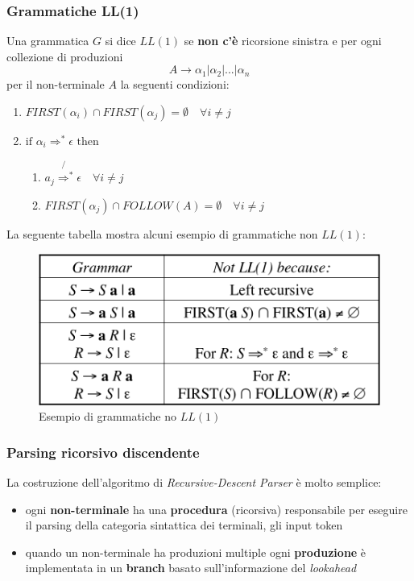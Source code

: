 \subsubsection{Grammatiche LL(1)}
\begin{definition}[LL(1) grammar]
Una grammatica $G$ si dice $LL(1)$ se \textbf{non c'\`e} ricorsione sinistra e
per ogni collezione di produzioni
$$A \to \alpha_1|\alpha_2|...|\alpha_n$$
per il non-terminale $A$ la seguenti condizioni:
\begin{enumerate}
\item $FIRST(\alpha_i) \cap FIRST(\alpha_j) = \emptyset \quad \forall i \neq j$
\item $\text{if } \alpha_i \Rightarrow^* \epsilon \text{ then}$
\begin{enumerate}
\item $a_j \not{\Rightarrow^*} \epsilon \quad \forall i \neq j$
\item $FIRST(\alpha_j) \cap FOLLOW(A) = \emptyset \quad \forall i \neq j$
\end{enumerate}
\end{enumerate}
\end{definition}

La seguente tabella mostra alcuni esempio di grammatiche non $LL(1)$:
\begin{figure}[H]
\begin{center}
\includegraphics[scale=0.5]{res/image/no_LL1}
\end{center}
\caption{Esempio di grammatiche no $LL(1)$}
\label{img:en_LL1}
\end{figure}

\subsubsection{Parsing ricorsivo discendente}
La costruzione dell'algoritmo di \textit{Recursive-Descent Parser} \`e molto
semplice:
\begin{itemize}
\item ogni \textbf{non-terminale} ha una \textbf{procedura} (ricorsiva)
responsabile per eseguire il parsing della categoria sintattica dei terminali,
gli input token
\item quando un non-terminale ha produzioni multiple ogni \textbf{produzione}
\`e implementata in un \textbf{branch} basato sull'informazione del
\textit{lookahead}
\end{itemize}

